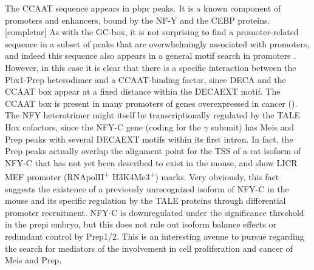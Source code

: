 
The CCAAT sequence appears in \ac{pbpr} peaks. It is a known component of promoters and enhancers, bound by the NF-Y and the CEBP proteins. [completar] As with the GC-box, it is not surprising to find a promoter-related sequence in a subset of peaks that are overwhelmingly associated with promoters, and indeed this sequence also appears in a general motif search in promoters \parencite{Hartmann2013}. However, in this case it is clear that there is a specific interaction between the Pbx1-Prep heterodimer and a CCAAT-binding factor, since \ac{DECA} and the CCAAT box appear at a fixed distance within the \ac{DECAEXT} motif. The CCAAT box is present in many promoters of genes overexpressed in cancer (\cite{Dolfini2013}). The NFY heterotrimer might itself be transcriptionally regulated by the \ac{TALE} Hox cofactors, since the NFY-C gene (coding for the $\gamma$ subunit) has Meis and Prep peaks with several \ac{DECAEXT} motifs within its first intron. In fact, the Prep peaks actually overlap the alignment point for the \ac{TSS} of a rat isoform of NFY-C that has not yet been described to exist in the mouse, and show LICR \ac{MEF} promoter (RNApolII\textsuperscript{+} H3K4Me3\textsuperscript{+}) marks. Very obviously, this fact suggests the existence of a previously unrecognized isoform of NFY-C in the mouse and its specific regulation by the \ac{TALE} proteins through differential promoter recruitment. NFY-C is downregulated under the significance threshold in the \ac{prepi} embryo, but this does not rule out isoform balance effects or redundant control by Prep1/2. This is an interesting avenue to pursue regarding the search for mediators of the involvement in cell proliferation and cancer of Meis and Prep.


 
